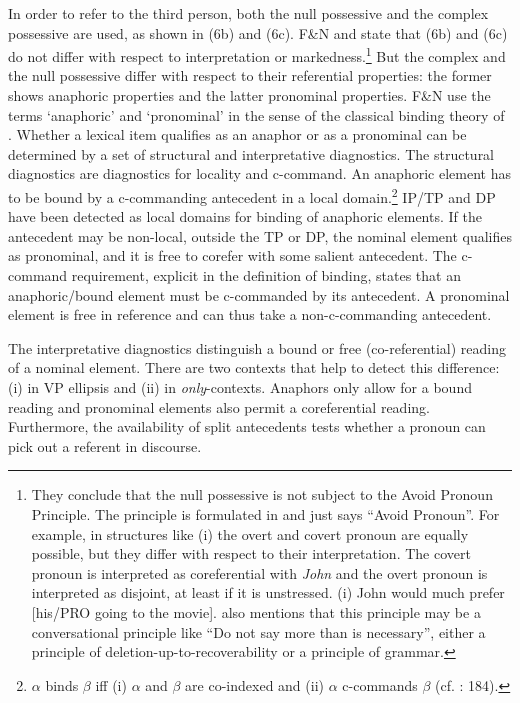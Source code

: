 \documentclass[output=paper]{langsci/langscibook}
\begin{document}
In order to refer to the third person, both the null possessive and the complex possessive are used, as shown in (6b) and (6c). F\&N and \citet{Rodrigues2010} state that (6b) and (6c) do not differ with respect to interpretation or markedness.\footnote{They conclude that the null possessive is not subject to the Avoid Pronoun Principle. The principle is formulated in \citet{Chomsky1981} and just says “Avoid Pronoun”. For example, in structures like (i) the overt and covert pronoun are equally possible, but they differ with respect to their interpretation. The covert pronoun is interpreted as coreferential with \textit{John} and the overt pronoun is interpreted as disjoint, at least if it is unstressed. (i) John would much prefer [his\slash PRO going to the movie]. \citet[65]{Chomsky1981} also mentions that this principle may be a conversational principle like “Do not say more than is necessary”, either a principle of deletion-up-to-recoverability or a principle of grammar.} But the complex and the null possessive differ with respect to their referential properties: the former shows anaphoric properties and the latter pronominal properties. F\&N use the terms ‘anaphoric’ and ‘pronominal’ in the sense of the classical binding theory of \citet{Chomsky1981,Chomsky1986Knowledge}. Whether a lexical item qualifies as an anaphor or as a pronominal can be determined by a set of structural and interpretative diagnostics. The structural diagnostics are diagnostics for locality and c-command. An anaphoric element has to be bound by a c-commanding antecedent in a local domain.\footnote{$\alpha $ binds $\beta $ iff (i) $\alpha $ and $\beta $ are co-indexed and (ii) $\alpha $ c-commands $\beta $ (cf. \citealt{Chomsky1981}: 184).} IP\slash TP and DP have been detected as local domains for binding of anaphoric elements. If the antecedent may be non-local, outside the TP or DP, the nominal element qualifies as pronominal, and it is free to corefer with some salient antecedent. The c-command requirement, explicit in the definition of binding, states that an anaphoric\slash bound element must be c-commanded by its antecedent. A pronominal element is free in reference and can thus take a non-c-commanding antecedent.

The interpretative diagnostics distinguish a bound or free (co-referential) reading of a nominal element. There are two contexts that help to detect this difference: (i) in VP ellipsis and (ii) in \textit{only}{}-contexts. Anaphors only allow for a bound reading and pronominal elements also permit a coreferential reading. Furthermore, the availability of split antecedents tests whether a pronoun can pick out a referent in discourse.
\end{document}
